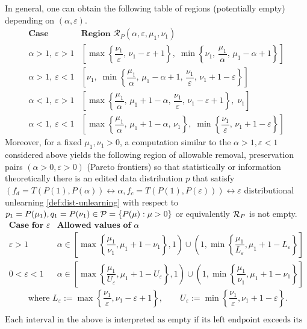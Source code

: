 \begin{remark}
In general, one can obtain the following table of regions (potentially empty) depending on  $(\alpha, \varepsilon)$.
\[
\begin{array}{c|l}  \label{table:Poissonregion}
\textbf{Case} & \textbf{Region } \mathcal R_P(\alpha,\varepsilon,\mu_1,\nu_1)
\\ \hline
\alpha>1,\ \varepsilon>1
&
\left[
\max\left\{
\dfrac{\nu_1}{\varepsilon},\,
\nu_1-\varepsilon+1
\right\},
\;
\min\left\{
\nu_1,\,
\dfrac{\mu_1}{\alpha},\,
\mu_1-\alpha+1
\right\}
\right]
\\[2ex]

\alpha>1,\ \varepsilon<1
&
\left[
\nu_1,\;
\min\left\{
\dfrac{\mu_1}{\alpha},\,
\mu_1-\alpha+1,\,
\dfrac{\nu_1}{\varepsilon},\,
\nu_1+1-\varepsilon
\right\}
\right]
\\[2ex]

\alpha<1,\ \varepsilon>1
&
\left[
\max\left\{
\dfrac{\mu_1}{\alpha},\,
\mu_1+1-\alpha,\,
\dfrac{\nu_1}{\varepsilon},\,
\nu_1-\varepsilon+1
\right\},
\;
\nu_1
\right]
\\[2ex]

\alpha<1,\ \varepsilon<1
&
\left[
\max\left\{
\dfrac{\mu_1}{\alpha},\,
\mu_1+1-\alpha,\,
\nu_1
\right\},
\;
\min\left\{
\dfrac{\nu_1}{\varepsilon},\,
\nu_1+1-\varepsilon
\right\}
\right]
\end{array}
\]
Moreover, for a fixed $\mu_1, \nu_1>0$, a computation similar to the $\alpha>1 , \varepsilon<1$ considered above yields the following region of allowable removal, preservation pairs $(\alpha >0, \varepsilon>0)$ (Pareto frontiers) so that statistically or information theoretically there is an edited data distribution $p$ that satisfy $(f_d =T(P(1), P(\alpha)) \leftrightarrow \alpha, f_c= T(P(1), P(\varepsilon)))\leftrightarrow \varepsilon$ distributional unlearning \ref{def:dist-unlearning} with respect to $p_1=P(\mu_1),q_1=P(\nu_1)\in \mathcal{P}= \{P(\mu): \mu >0\}$ or equivalently $\mathcal{R}_P$ is not empty.
\[
\begin{array}{c|c} \label{table:Paretofrontiers}
\textbf{Case for }\varepsilon
&
\textbf{Allowed values of }\alpha
\\ \hline
\varepsilon>1
&
\displaystyle
\alpha\in
\left[
\max\left\{
\dfrac{\mu_1}{\nu_1},
\mu_1+1-\nu_1
\right\},
1
\right)
\cup
\left(
1,
\min\left\{
\dfrac{\mu_1}{L_\varepsilon},
\mu_1+1-L_\varepsilon
\right\}
\right]
\\[4ex]
0<\varepsilon<1
&
\displaystyle
\alpha\in
\left[
\max\left\{
\dfrac{\mu_1}{U_\varepsilon},
\mu_1+1-U_\varepsilon
\right\},
1
\right)
\cup
\left(
1,
\min\left\{
\dfrac{\mu_1}{\nu_1},
\mu_1+1-\nu_1
\right\}
\right]
\end{array}
\]
\[
\text{ where }
L_\varepsilon
:=
\max\left\{
\dfrac{\nu_1}{\varepsilon},
\nu_1-\varepsilon+1
\right\},
\qquad
U_\varepsilon
:=
\min\left\{
\dfrac{\nu_1}{\varepsilon},
\nu_1+1-\varepsilon
\right\}.
\]

\[
\text{Each interval in the above is interpreted as empty if its left endpoint exceeds its right endpoint.}
\]
\end{remark}
